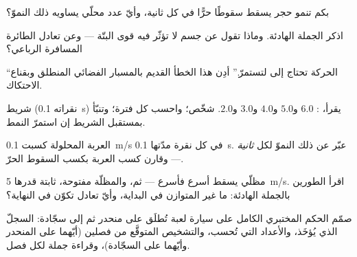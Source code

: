 \begin{exercise}[$\star$]\label{exo:g9:uniform-varied-motion:6}
بكم تنمو  حجر يسقط سقوطًا حرًّا في كل ثانية، وأيّ عدد
محلّي يساويه ذلك النموّ؟
\end{exercise}

\begin{exercise}[$\star$]\label{exo:g9:uniform-varied-motion:7}
اذكر الجملة الهادئة. وماذا تقول عن جسم لا تؤثّر فيه قوى
البتّة --- وعن تعادل الطائرة المسافرة الرباعي؟
\end{exercise}

\begin{exercise}[$\star$]\label{exo:g9:uniform-varied-motion:8}
``الحركة تحتاج إلى  لتستمرّ.'' أدِن هذا الخطأ القديم
بالمسبار الفضائي المنطلق وبقناع الاحتكاك.
\end{exercise}

\begin{exercise}[$\star\star$]\label{exo:g9:uniform-varied-motion:9}
شريط (نقراته \qty{0.1}{s}) يقرأ، : $6.0$ و$5.0$
و$4.0$ و$3.0$ و$2.0$. شخّص؛ واحسب  كل فترة؛ وتنبّأ بمستقبل
الشريط إن استمرّ النمط.
\end{exercise}

\begin{exercise}[$\star\star$]\label{exo:g9:uniform-varied-motion:10}
العربة المحلولة كسبت \qty{0.1}{m/s} في كل نقرة مدّتها
\qty{0.1}{s}. عبّر عن ذلك النموّ لكل \emph{ثانية} --- وقارن
كسب العربة بكسب السقوط الحرّ.
\end{exercise}

\begin{exercise}[$\star\star$]\label{exo:g9:uniform-varied-motion:11}
مظلّي يسقط أسرع فأسرع --- ثم، والمظلّة مفتوحة،  ثابتة
قدرها \qty{5}{m/s}. اقرأ الطورين بالجملة الهادئة: ما غير
المتوازن في البداية، وأيّ تعادل تكوّن في النهاية؟
\end{exercise}

\begin{exercise}[$\star\star\star$]\label{exo:g9:uniform-varied-motion:12}
صمّم الحكم المختبري الكامل على سيارة لعبة تُطلَق على منحدر ثم
إلى سجّادة: السجلّ الذي يُؤخَذ، والأعداد التي تُحسب، والتشخيص
المتوقَّع من فصلين (أيّهما على المنحدر وأيّهما على السجّادة)،
وقراءة جملة  لكل فصل.
\end{exercise}


